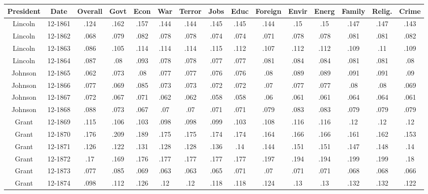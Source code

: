 \begin{sidewaystable}
\begin{singlespace}
\begin{center}
 \begin{tabular}{||c c c c c c c c c c c c c c c||}
 \hline
 President & Date & Overall & Govt & Econ & War & Terror & Jobs & Educ & Foreign & Envir & Energ & Family & Relig. & Crime \\
 \hline\hline
Lincoln & 12-1861 & .124 & .162 & .157 & .144 & .144 & .145 & .145 & .144 & .15 & .15 & .147 & .147 & .143 \\ 
\hline
Lincoln & 12-1862 & .068 & .079 & .082 & .078 & .078 & .074 & .074 & .071 & .078 & .078 & .081 & .081 & .082 \\ 
\hline
Lincoln & 12-1863 & .086 & .105 & .114 & .114 & .114 & .115 & .112 & .107 & .112 & .112 & .109 & .11 & .109 \\ 
\hline
Lincoln & 12-1864 & .087 & .08 & .093 & .078 & .078 & .077 & .077 & .081 & .084 & .084 & .081 & .081 & .08 \\ 
\hline
Johnson & 12-1865 & .062 & .073 & .08 & .077 & .077 & .076 & .076 & .08 & .089 & .089 & .091 & .091 & .09 \\ 
\hline
Johnson & 12-1866 & .077 & .069 & .085 & .073 & .073 & .072 & .072 & .07 & .077 & .077 & .08 & .08 & .069 \\ 
\hline
Johnson & 12-1867 & .072 & .067 & .071 & .062 & .062 & .058 & .058 & .06 & .061 & .061 & .064 & .064 & .061 \\ 
\hline
Johnson & 12-1868 & .088 & .073 & .067 & .07 & .07 & .071 & .071 & .079 & .083 & .083 & .079 & .079 & .079 \\ 
\hline
Grant & 12-1869 & .115 & .106 & .103 & .098 & .098 & .099 & .103 & .108 & .116 & .116 & .12 & .12 & .12 \\ 
\hline
Grant & 12-1870 & .176 & .209 & .189 & .175 & .175 & .174 & .174 & .164 & .166 & .166 & .161 & .162 & .153 \\ 
\hline
Grant & 12-1871 & .126 & .122 & .131 & .128 & .128 & .136 & .14 & .144 & .151 & .151 & .147 & .148 & .14 \\ 
\hline
Grant & 12-1872 & .17 & .169 & .176 & .177 & .177 & .177 & .177 & .197 & .194 & .194 & .199 & .199 & .18 \\ 
\hline
Grant & 12-1873 & .077 & .085 & .069 & .063 & .063 & .065 & .071 & .07 & .071 & .071 & .068 & .068 & .066 \\ 
\hline
Grant & 12-1874 & .098 & .112 & .126 & .12 & .12 & .118 & .118 & .124 & .13 & .13 & .132 & .132 & .122 \\ 

\end{tabular}
\end{center}
\end{singlespace}
\end{sidewaystable}
